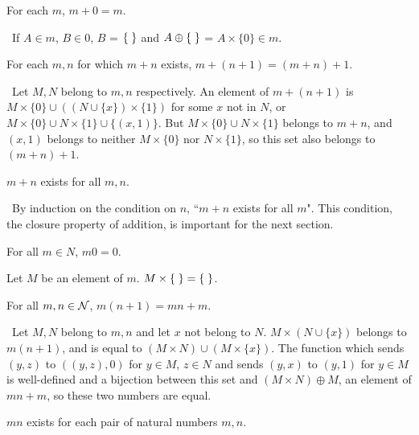 \begin{thm}
 For each $m$, $m+0 = m$.
\end{thm}

\preuve\ If $A \in m$, $B \in 0$, $B$ = $\mbox{$\{\;\}$}$ and $A \oplus \mbox{$\{\;\}$}$ = $A
\times \{0\} \in m$.
\finpreuve

\begin{thm}
 For each $m,n$ for which $m + n$ exists, $m + (n+1) = (m + n)+1$.
\end{thm}

\preuve\ Let $M, N$ belong to $m, n$ respectively.  An element of $m + (n+1)$
is $M \times \{0\} \cup ((N \cup \{x\}) \times \{1\})$ for some $x$ not in $N$,
or $M \times \{0\} \cup N \times \{1\} \cup \{(x,1)\}$.  But $M \times \{0\}
\cup N \times \{1\}$ belongs to $m + n$, and $(x,1)$ belongs to neither $M
\times \{0\}$ nor $N \times \{1\}$, so this set also belongs to $(m + n) +
1$.\linebreak
\mbox{}\finpreuve

\begin{cor}
 $m + n$ exists for all $m,n$.
\end{cor}

\preuve\ By induction on the condition on $n$,
``$m+n$ exists for all $m$".  This condition, the closure property of
addition, is important for the next
section.
\finpreuve

\begin{thm}
 For all $m \in N$, $m0 = 0$.
\end{thm}

\preuve Let $M$ be an element of $m$.  $M \times \mbox{$\{\;\}$} = \mbox{$\{\;\}$}$.
\finpreuve

\begin{thm}
 For all $m,n \in {\cal N}$, $m(n+1) = mn + m$.
\end{thm}

\preuve\ Let $M,N$ belong to $m,n$ and let $x$ not belong to $N$.  $M \times (N
\cup \{x\})$ belongs to $m(n+1)$, and is equal to $(M \times N) \cup (M \times
\{x\})$.  The function which sends $(y,z)$ to $((y,z),0)$ for
$y \in M$, $z \in N$ and sends $(y,x)$ to $(y,1)$ for $y \in M$ is well-defined
and a bijection between this set and $(M \times N) \oplus M$,
an element of $mn + m$, so these two numbers are equal.
\finpreuve

\begin{cor}
 $mn$ exists for each pair of natural numbers $m,n$.
\end{cor}

